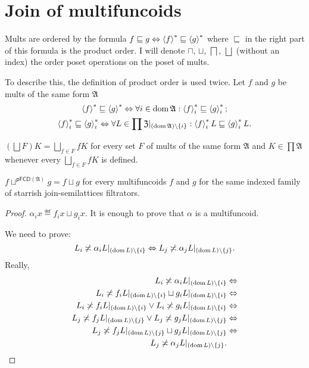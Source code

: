 \section{Join of multifuncoids}

Mults are ordered by the formula $f\sqsubseteq g\Leftrightarrow\left\langle f\right\rangle ^{\ast}\sqsubseteq\left\langle g\right\rangle ^{\ast}$
where $\sqsubseteq$ in the right part of this formula is the product
order. I will denote $\sqcap$, $\sqcup$, $\bigsqcap$, $\bigsqcup$
(without an index) the order poset operations on the poset of mults.
\begin{rem}
To describe this, the definition of product order is used twice. Let
$f$ and $g$ be mults of the same form $\mathfrak{A}$
\begin{gather*}
\left\langle f\right\rangle ^{\ast}\sqsubseteq\left\langle g\right\rangle ^{\ast}\Leftrightarrow\forall i\in\operatorname{dom}\mathfrak{A}:\left\langle f\right\rangle ^{\ast}_{i}\sqsubseteq\left\langle g\right\rangle ^{\ast}_{i};\\
\left\langle f\right\rangle ^{\ast}_{i}\sqsubseteq\left\langle g\right\rangle ^{\ast}_{i}\Leftrightarrow\forall L\in\prod\mathfrak{Z}|_{(\operatorname{dom}\mathfrak{A})\setminus\{i\}}:\left\langle f\right\rangle ^{\ast}_{i}L\sqsubseteq\left\langle g\right\rangle ^{\ast}_{i}L.
\end{gather*}
\end{rem}
\begin{obvious}
$\left(\bigsqcup F\right)K=\bigsqcup_{f\in F}fK$ for every set $F$
of mults of the same form $\mathfrak{A}$ and $K\in\prod\mathfrak{A}$
whenever every $\bigsqcup_{f\in F}fK$ is defined.\end{obvious}
\begin{thm}
$f\sqcup^{\mathsf{pFCD}(\mathfrak{A})}g=f\sqcup g$ for every multifuncoids
$f$ and $g$ for the same indexed family of starrish join-semilattices
filtrators.\end{thm}
\begin{proof}
$\alpha_{i}x\eqdef f_{i}x\sqcup g_{i}x$. It is enough to prove that
$\alpha$ is a multifuncoid.

We need to prove: 
\[
L_{i}\not\asymp\alpha_{i}L|_{(\operatorname{dom} L)\setminus\{i\}}\Leftrightarrow L_{j}\not\asymp\alpha_{j}L|_{(\operatorname{dom} L)\setminus\{j\}}.
\]
Really,
\begin{align*}
L_{i}\not\asymp\alpha_{i}L|_{(\operatorname{dom} L)\setminus\{i\}} & \Leftrightarrow\\
L_{i}\not\asymp f_{i}L|_{(\operatorname{dom} L)\setminus\{i\}}\sqcup g_{i}L|_{(\operatorname{dom} L)\setminus\{i\}} & \Leftrightarrow\\
L_{i}\not\asymp f_{i}L|_{(\operatorname{dom} L)\setminus\{i\}}\lor L_{i}\not\asymp g_{i}L|_{(\operatorname{dom} L)\setminus\{i\}} & \Leftrightarrow\\
L_{j}\not\asymp f_{j}L|_{(\operatorname{dom} L)\setminus\{j\}}\lor L_{j}\not\asymp g_{j}L|_{(\operatorname{dom} L)\setminus\{j\}} & \Leftrightarrow\\
L_{j}\not\asymp f_{j}L|_{(\operatorname{dom} L)\setminus\{j\}}\sqcup g_{j}L|_{(\operatorname{dom} L)\setminus\{j\}} & \Leftrightarrow\\
L_{j}\not\asymp\alpha_{j}L|_{(\operatorname{dom} L)\setminus\{j\}}.
\end{align*}
\end{proof}
